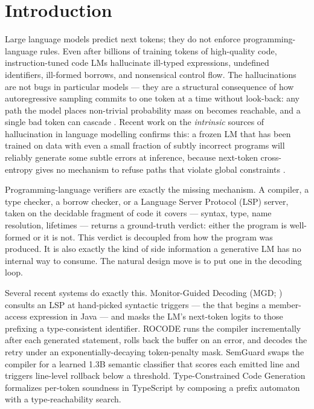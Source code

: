 \section{Introduction}\label{sec:intro}

Large language models predict next tokens; they do not enforce
programming-language rules. Even after billions of training tokens of
high-quality code, instruction-tuned code LMs hallucinate
ill-typed expressions, undefined identifiers, ill-formed borrows, and
nonsensical control flow. The hallucinations are not bugs in
particular models --- they are a structural consequence of how
autoregressive sampling commits to one token at a time without
look-back: any path the model places non-trivial probability mass on
becomes reachable, and a single bad token can cascade
\citep{jiang2024rocode,wang2025semguard}. Recent work on the
\emph{intrinsic} sources of hallucination in language modelling
confirms this: a frozen LM that has been trained on data with even a
small fraction of subtly incorrect programs will reliably generate
some subtle errors at inference, because next-token cross-entropy
gives no mechanism to refuse paths that violate global constraints
\citep{olausson2024selfrepair}.

Programming-language verifiers are exactly the missing mechanism.
A compiler, a type checker, a borrow checker, or a Language Server
Protocol (LSP) server, taken on the decidable fragment of code it
covers --- syntax, type, name resolution, lifetimes --- returns a
ground-truth verdict: either the program is well-formed or it is not.
This verdict is decoupled from how the program was produced. It is
also exactly the kind of side information a generative LM has no
internal way to consume. The natural design move is to put one in the
decoding loop.

Several recent systems do exactly this. Monitor-Guided Decoding
(MGD; \citealp{agrawal2023monitor}) consults an LSP at hand-picked
syntactic triggers --- the  that begins a member-access
expression in Java --- and masks the LM's next-token logits to those
prefixing a type-consistent identifier. ROCODE
\citep{jiang2024rocode} runs the compiler incrementally after each
generated statement, rolls back the buffer on an error, and decodes
the retry under an exponentially-decaying token-penalty mask.
SemGuard \citep{wang2025semguard} swaps the compiler for a learned
1.3B semantic classifier that scores each emitted line and triggers
line-level rollback below a threshold. Type-Constrained Code
Generation \citep{mundler2025typeconstrained} formalizes per-token
soundness in TypeScript by composing a prefix automaton with a
type-reachability search.

